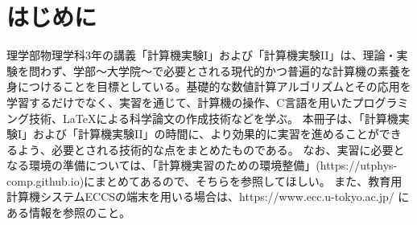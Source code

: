 \section*{はじめに}

\noindent
理学部物理学科3年の講義「計算機実験I」および「計算機実験II」は、理論・実験を問わず、学部〜大学院〜で必要とされる現代的かつ普遍的な計算機の素養を身につけることを目標としている。基礎的な数値計算アルゴリズムとその応用を学習するだけでなく、実習を通じて、計算機の操作、C言語を用いたプログラミング技術、\LaTeX による科学論文の作成技術などを学ぶ。
本冊子は、「計算機実験I」および「計算機実験II」の時間に、より効果的に実習を進めることができるよう、必要とされる技術的な点をまとめたものである。
なお、実習に必要となる環境の準備については、「計算機実習のための環境整備」(https://utphys-comp.github.io)にまとめてあるので、そちらを参照してほしい。
また、教育用計算機システムECCSの端末を用いる場合は、https://www.ecc.u-tokyo.ac.jp/ にある情報を参照のこと。
